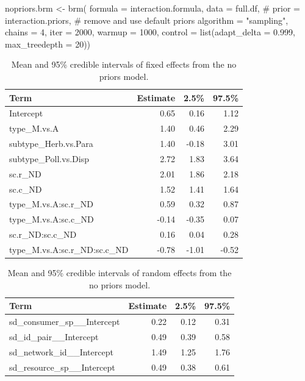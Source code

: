 \documentclass[11pt,]{article}
\newenvironment{Shaded}{}{}
\newcommand{\KeywordTok}[1]{\textcolor[rgb]{0.00,0.00,1.00}{#1}}
\newcommand{\DataTypeTok}[1]{#1}
\newcommand{\DecValTok}[1]{#1}
\newcommand{\FloatTok}[1]{#1}
\newcommand{\StringTok}[1]{\textcolor[rgb]{0.00,0.50,0.50}{#1}}
\newcommand{\CommentTok}[1]{\textcolor[rgb]{0.00,0.50,0.00}{#1}}
\newcommand{\NormalTok}[1]{#1}
\begin{document}
\begin{Shaded}
\begin{Highlighting}[]
\NormalTok{nopriors.brm <-}\StringTok{ }\KeywordTok{brm}\NormalTok{(}
  \DataTypeTok{formula =}\NormalTok{ interaction.formula, }\DataTypeTok{data =}\NormalTok{ full.df, }
  \CommentTok{# prior = interaction.priors, # remove and use default priors}
  \DataTypeTok{algorithm =} \StringTok{"sampling"}\NormalTok{, }\DataTypeTok{chains =} \DecValTok{4}\NormalTok{, }\DataTypeTok{iter =} \DecValTok{2000}\NormalTok{, }\DataTypeTok{warmup =} \DecValTok{1000}\NormalTok{, }
  \DataTypeTok{control =} \KeywordTok{list}\NormalTok{(}\DataTypeTok{adapt_delta =} \FloatTok{0.999}\NormalTok{, }\DataTypeTok{max_treedepth =} \DecValTok{20}\NormalTok{))}
\end{Highlighting}
\end{Shaded}

\begin{table}[!h]

\caption{\label{tab:nopriors-table}Mean and 95\% credible intervals of fixed effects from the no priors model.}
\centering
\begin{tabular}{lrrr}
\toprule
Term & Estimate & 2.5\% & 97.5\%\\
\midrule
\rowcolor{gray!6}  Intercept & 0.65 & 0.16 & 1.12\\
type\_M.vs.A & 1.40 & 0.46 & 2.29\\
\rowcolor{gray!6}  subtype\_Herb.vs.Para & 1.40 & -0.18 & 3.01\\
subtype\_Poll.vs.Disp & 2.72 & 1.83 & 3.64\\
\rowcolor{gray!6}  sc.r\_ND & 2.01 & 1.86 & 2.18\\
\addlinespace
sc.c\_ND & 1.52 & 1.41 & 1.64\\
\rowcolor{gray!6}  type\_M.vs.A:sc.r\_ND & 0.59 & 0.32 & 0.87\\
type\_M.vs.A:sc.c\_ND & -0.14 & -0.35 & 0.07\\
\rowcolor{gray!6}  sc.r\_ND:sc.c\_ND & 0.16 & 0.04 & 0.28\\
type\_M.vs.A:sc.r\_ND:sc.c\_ND & -0.78 & -1.01 & -0.52\\
\bottomrule
\end{tabular}
\end{table}

\begin{table}[!h]

\caption{\label{tab:nopriors-table-random}Mean and 95\% credible intervals of random effects from the no priors model.}
\centering
\begin{tabular}{lrrr}
\toprule
Term & Estimate & 2.5\% & 97.5\%\\
\midrule
\rowcolor{gray!6}  sd\_consumer\_sp\_\_Intercept & 0.22 & 0.12 & 0.31\\
sd\_id\_pair\_\_Intercept & 0.49 & 0.39 & 0.58\\
\rowcolor{gray!6}  sd\_network\_id\_\_Intercept & 1.49 & 1.25 & 1.76\\
sd\_resource\_sp\_\_Intercept & 0.49 & 0.38 & 0.61\\
\bottomrule
\end{tabular}
\end{table}
\end{document}
